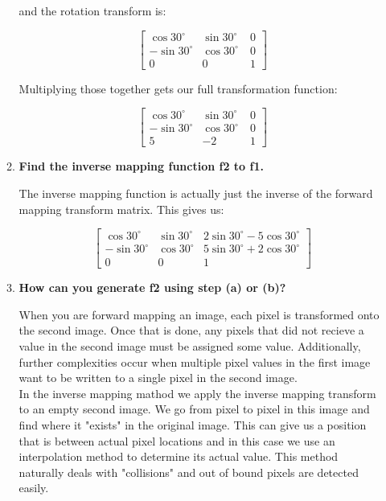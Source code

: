 \begin{enumerate}[font=\bfseries]
\begin{enumerate}[label=\alph*., font=\bfseries]
	and the rotation transform is:
	
	$$
	\begin{bmatrix}
	\cos30^\circ & \sin30^\circ & 0 \\
	-\sin30^\circ & \cos30^\circ\ & 0 \\
	0 & 0 & 1 
	\end{bmatrix}
	$$
	
	Multiplying those together gets our full transformation function:

	$$
	\begin{bmatrix}
	\cos30^\circ & \sin30^\circ & 0 \\
	-\sin30^\circ & \cos30^\circ\ & 0 \\
	5 & -2 & 1 
	\end{bmatrix}
	$$
	
	\item \textbf{Find the inverse mapping function f2 to f1.}

	The inverse mapping function is actually just the inverse of the forward
	mapping transform matrix. This gives us: 

	$$
	\begin{bmatrix}
	\cos30^\circ & \sin30^\circ & 2\sin30^\circ - 5\cos30^\circ \\
	-\sin30^\circ & \cos30^\circ & 5\sin30^\circ + 2\cos30^\circ \\
	0 & 0 & 1
	\end{bmatrix}
	$$

	\item \textbf{How can you generate f2 using step (a) or (b)?}
	
	When you are forward mapping an image, each pixel is transformed onto
	the second image. Once that is done, any pixels that did not recieve a
	value in the second image must be assigned some value. Additionally,
	further complexities occur when multiple pixel values in the first image
	want to be written to a single pixel in the second image. \\

	In the inverse mapping mathod we apply the inverse mapping transform to
	an empty second image. We go from pixel to pixel in this image and find
	where it "exists" in the original image. This can give us a position
	that is between actual pixel locations and in this case we use an
	interpolation method to determine its actual value. This method
	naturally deals with "collisions" and out of bound pixels are detected
	easily.

    \end{enumerate}

\end{enumerate}
